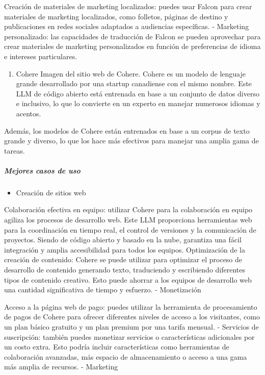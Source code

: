 \documentclass[a4paper12pt]{article}
\providecommand{\tightlist}{%
      \setlength{\itemsep}{0pt}\setlength{\parskip}{0pt}}
\begin{document}
Creación de materiales de marketing localizados: puedes usar Falcon para
crear materiales de marketing localizados, como folletos, páginas de
destino y publicaciones en redes sociales adaptados a audiencias
específicas. - Marketing personalizado: las capacidades de traducción de
Falcon se pueden aprovechar para crear materiales de marketing
personalizados en función de preferencias de idioma e intereses
particulares.

\begin{enumerate}
\def\labelenumi{\arabic{enumi}.}
\setcounter{enumi}{5}
\tightlist
\item
  Cohere Imagen del sitio web de Cohere. Cohere es un modelo de lenguaje
  grande desarrollado por una startup canadiense con el mismo nombre.
  Este LLM de código abierto está entrenada en base a un conjunto de
  datos diverso e inclusivo, lo que lo convierte en un experto en
  manejar numerosos idiomas y acentos.
\end{enumerate}

Además, los modelos de Cohere están entrenados en base a un corpus de
texto grande y diverso, lo que los hace más efectivos para manejar una
amplia gama de tareas.

\hypertarget{mejores-casos-de-uso-5}{%
\subparagraph{Mejores casos de uso}\label{mejores-casos-de-uso-5}}

\begin{itemize}
\tightlist
\item
  Creación de sitios web
\end{itemize}

Colaboración efectiva en equipo: utilizar Cohere para la colaboración en
equipo agiliza los procesos de desarrollo web. Este LLM proporciona
herramientas web para la coordinación en tiempo real, el control de
versiones y la comunicación de proyectos. Siendo de código abierto y
basado en la nube, garantiza una fácil integración y amplia
accesibilidad para todos los equipos. Optimización de la creación de
contenido: Cohere se puede utilizar para optimizar el proceso de
desarrollo de contenido generando texto, traduciendo y escribiendo
diferentes tipos de contenido creativo. Esto puede ahorrar a los equipos
de desarrollo web una cantidad significativa de tiempo y esfuerzo. -
Monetización

Acceso a la página web de pago: puedes utilizar la herramienta de
procesamiento de pagos de Cohere para ofrecer diferentes niveles de
acceso a los visitantes, como un plan básico gratuito y un plan premium
por una tarifa mensual. - Servicios de suscripción: también puedes
monetizar servicios o características adicionales por un costo extra.
Esto podría incluir características como herramientas de colaboración
avanzadas, más espacio de almacenamiento o acceso a una gama más amplia
de recursos. - Marketing
\end{document}
